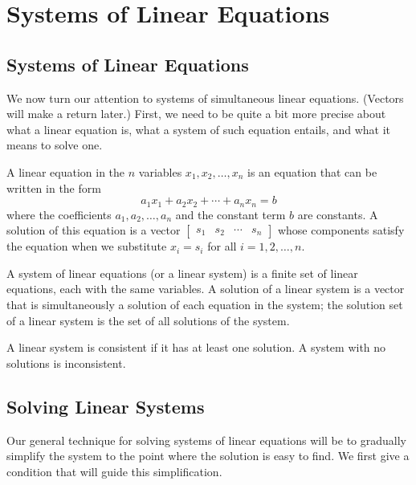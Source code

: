 \documentclass[../m073main.tex]{subfiles}
\begin{document}
\chapter{Systems of Linear Equations}
\section{Systems of Linear Equations}
We now turn our attention to systems of simultaneous linear equations.
(Vectors will make a return later.)
First, we need to be quite a bit more precise about what a linear equation is, what a system of such equation entails, and what it means to solve one.

\begin{definition}
	A linear equation in the $n$ variables $x_1, x_2, \ldots, x_n$ is an equation that can be written in the form
	\[ a_1 x_1 + a_2 x_2 + \cdots + a_n x_n = b \]
	where the coefficients $a_1, a_2, \ldots, a_n$ and the constant term $b$ are constants.
	A solution of this equation is a vector $\begin{bmatrix} s_1 & s_2 & \cdots & s_n \end{bmatrix}$ whose components satisfy the equation when we substitute $x_i = s_i$ for all $i = 1, 2, \ldots, n$.
\end{definition}

\begin{definition}
	A system of linear equations (or a linear system) is a finite set of linear equations, each with the same variables.
	A solution of a linear system is a vector that is simultaneously a solution of each equation in the system; the solution set of a linear system is the set of all solutions of the system.
\end{definition}

\begin{definition}
	A linear system is consistent if it has at least one solution.
	A system with no solutions is inconsistent.
\end{definition}

\section{Solving Linear Systems}
Our general technique for solving systems of linear equations will be to gradually simplify the system to the point where the solution is easy to find.
We first give a condition that will guide this simplification.
\end{document}
